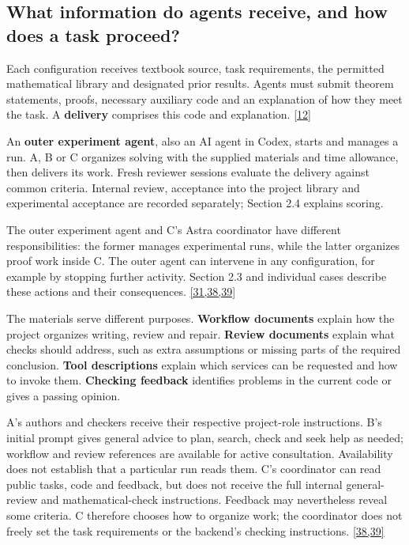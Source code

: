\subsection[What information do agents receive, and how does a task proceed?]{\texorpdfstring{\protect\hypertarget{section-2-2}{}What information do agents receive, and how does a task proceed?}{What information do agents receive, and how does a task proceed?}}
Each configuration receives textbook source, task requirements, the permitted mathematical library and designated prior results. Agents must submit theorem statements, proofs, necessary auxiliary code and an explanation of how they meet the task. A \textbf{delivery} comprises this code and explanation. \hyperlink{ref-12}{\mbox{[12]}}

An \textbf{outer experiment agent}, also an AI agent in Codex, starts and manages a run. A, B or C organizes solving with the supplied materials and time allowance, then delivers its work. Fresh reviewer sessions evaluate the delivery against common criteria. Internal review, acceptance into the project library and experimental acceptance are recorded separately; Section 2.4 explains scoring.

The outer experiment agent and C's Astra coordinator have different responsibilities: the former manages experimental runs, while the latter organizes proof work inside C. The outer agent can intervene in any configuration, for example by stopping further activity. Section 2.3 and individual cases describe these actions and their consequences. \hyperlink{ref-31}{\mbox{[31,38,39]}}

The materials serve different purposes. \textbf{Workflow documents} explain how the project organizes writing, review and repair. \textbf{Review documents} explain what checks should address, such as extra assumptions or missing parts of the required conclusion. \textbf{Tool descriptions} explain which services can be requested and how to invoke them. \textbf{Checking feedback} identifies problems in the current code or gives a passing opinion.

A's authors and checkers receive their respective project-role instructions. B's initial prompt gives general advice to plan, search, check and seek help as needed; workflow and review references are available for active consultation. Availability does not establish that a particular run reads them. C's coordinator can read public tasks, code and feedback, but does not receive the full internal general-review and mathematical-check instructions. Feedback may nevertheless reveal some criteria. C therefore chooses how to organize work; the coordinator does not freely set the task requirements or the backend's checking instructions. \hyperlink{ref-38}{\mbox{[38,39]}}

